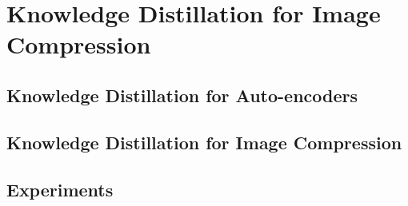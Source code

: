 \chapter{Knowledge Distillation for Image Compression}
\label{part_2}

\section{Knowledge Distillation for Auto-encoders}

\section{Knowledge Distillation for Image Compression}

\section{Experiments}
